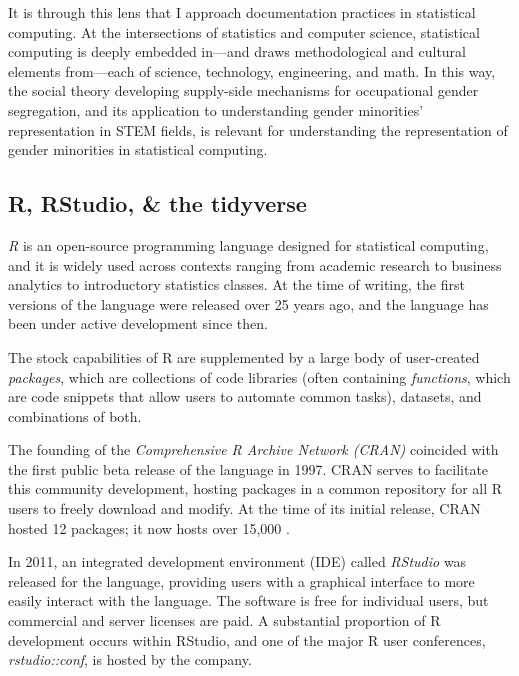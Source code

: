 It is through this lens that I approach documentation practices in statistical computing. At the intersections of statistics and computer science, statistical computing is deeply embedded in—and draws methodological and cultural elements from—each of science, technology, engineering, and math. In this way, the social theory developing supply-side mechanisms for occupational gender segregation, and its application to understanding gender minorities’ representation in STEM fields, is relevant for understanding the representation of gender minorities in statistical computing.  

\subsection{R, RStudio, \& the tidyverse}\label{sec:tidy}

\textit{R} is an open-source programming language designed for statistical computing, and it is widely used across contexts ranging from academic research to business analytics to introductory statistics classes. At the time of writing, the first versions of the language were released over 25 years ago, and the language has been under active development since then. 

The stock capabilities of R are supplemented by a large body of user-created \textit{packages}, which are collections of code libraries (often containing \textit{functions}, which are code snippets that allow users to automate common tasks), datasets, and combinations of both. 

The founding of the \textit{Comprehensive R Archive Network (CRAN)} coincided with the first public beta release of the language in 1997. CRAN serves to facilitate this community development,  hosting packages in a common repository for all R users to freely download and modify. At the time of its initial release, CRAN hosted 12 packages; it now hosts over 15,000 \cite{cran}.

In 2011, an integrated development environment (IDE) called \textit{RStudio} was released for the language, providing users with a graphical interface to more easily interact with the language. The software is free for individual users, but commercial and server licenses are paid. A substantial proportion of R development occurs within RStudio, and one of the major R user conferences, \textit{rstudio::conf}, is hosted by the company.

